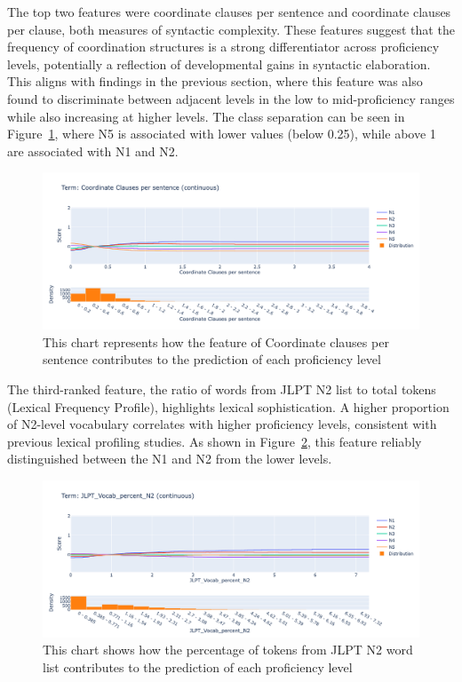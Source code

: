 The top two features were coordinate clauses per sentence and coordinate clauses per clause, both measures of
syntactic complexity. These features suggest that the frequency of coordination structures is a strong
differentiator across proficiency levels, potentially a reflection of developmental gains in syntactic elaboration. This
aligns with findings in the previous section, where this feature was also found to discriminate between adjacent
levels in
the low to mid-proficiency ranges while also increasing at higher levels. The class
separation can be seen in Figure~\ref{fig:EBMccPerSent}, where N5 is associated with lower values (below 0.25),
while above 1 are associated with N1 and N2.


\begin{figure}[h!]
    \centering
    \includegraphics[scale=.4]{img/EBM/EBMccPerSent}
    \caption[Contribution of Coordinate Clauses per Sentence]{This chart represents how the feature of Coordinate clauses per sentence contributes to the prediction of each proficiency level}
    \label{fig:EBMccPerSent}
\end{figure}


The third-ranked feature, the ratio of words from JLPT N2 list to total tokens (Lexical Frequency Profile), highlights
lexical sophistication. A higher proportion of N2-level vocabulary
correlates with higher proficiency levels, consistent with previous lexical profiling studies\citep{Laufer1995}.
As shown in Figure~\ref{fig:EBMjlptN2}, this feature reliably distinguished between the N1 and N2 from the lower
levels.

\begin{figure}[h!]
    \centering
    \includegraphics[scale=.4]{img/EBM/JLPTn2P}
    \caption[Contribution of percentage of tokens from JLPT N2 vocabulary list]{This chart shows how the percentage of tokens from JLPT N2 word list contributes to the prediction of each proficiency level}
    \label{fig:EBMjlptN2}
\end{figure}

